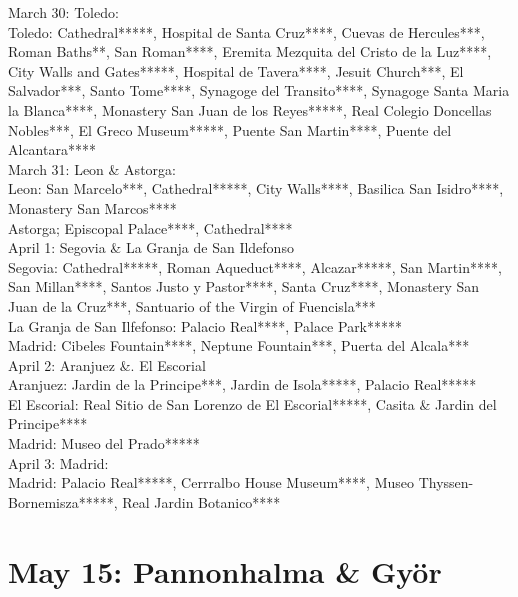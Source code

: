 March 30: Toledo:\\

Toledo: Cathedral*****, Hospital de Santa Cruz****, Cuevas de Hercules***, Roman Baths**, San Roman****, Eremita Mezquita del Cristo de la Luz****, City Walls and Gates*****, Hospital de Tavera****, Jesuit Church***, El Salvador***, Santo Tome****, Synagoge del Transito****, Synagoge Santa Maria la Blanca****, Monastery San Juan de los Reyes*****, Real Colegio Doncellas Nobles***, El Greco Museum*****, Puente San Martin****, Puente del Alcantara****\\

March 31: Leon \& Astorga:\\

Leon: San Marcelo***, Cathedral*****, City Walls****,  Basilica San Isidro****, Monastery San Marcos****\\
Astorga; Episcopal Palace****, Cathedral****\\

April 1: Segovia \& La Granja de San Ildefonso\\

Segovia: Cathedral*****, Roman Aqueduct****, Alcazar*****, San Martin****, San Millan****, Santos Justo y Pastor****, Santa Cruz****, Monastery San Juan de la Cruz***, Santuario of the Virgin of Fuencisla***\\
La Granja de San Ilfefonso: Palacio Real****, Palace Park*****\\
Madrid: Cibeles Fountain****, Neptune Fountain***, Puerta del Alcala***\\

April 2: Aranjuez \&. El Escorial\\

Aranjuez: Jardin de la Principe***, Jardin de Isola*****, Palacio Real*****\\
El Escorial: Real Sitio de San Lorenzo de El Escorial*****, Casita \& Jardin del Principe****\\
Madrid: Museo del Prado*****\\

April 3: Madrid:\\

Madrid: Palacio Real*****, Cerrralbo House Museum****, Museo Thyssen-Bornemisza*****, Real Jardin Botanico****\\

\section{May 15: Pannonhalma \& Gy\"or}
\label{2022:PannonhalmaGyor}

